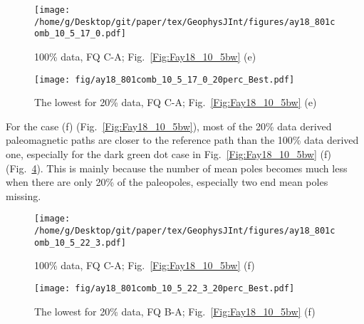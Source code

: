 \begin{figure*}[tbp]
  \captionsetup[subfigure]{labelformat=empty,aboveskip=-6pt,belowskip=-6pt}
  \centering
  \begin{subfigure}[htbp]{.49\textwidth}
    \captionsetup{skip=0pt}
    \centering
    \texttt{[image: /home/g/Desktop/git/paper/tex/GeophysJInt/figures/ay18\_801comb\_10\_5\_17\_0.pdf]}
	\caption{100\% data, FQ C-A; Fig.~\ref{Fig:Fay18_10_5bw}
	(e)}\label{Fig:Fay18_10_5b801}
  \end{subfigure}
  \begin{subfigure}[htbp]{.49\textwidth}
    \captionsetup{skip=0pt}
    \centering
    \texttt{[image: fig/ay18\_801comb\_10\_5\_17\_0\_20perc\_Best.pdf]} %
    \caption{The lowest for 20\% data, FQ C-A;
	Fig.~\ref{Fig:Fay18_10_5bw} (e)}\label{Fig:Fay18_10_5b801l20p}
  \end{subfigure}
  \caption[Less data, better similarity?]{Comparing the 100\% Australian
  120 Ma paleomagnetic data derived result with the best of the only
  20\% data derived results (the dark green dot in Fig.~\ref{Fig:Fay18_10_5bw}
  (e)).}\label{Fig:Fay18_10_5b801l20p_vs_100p}
\end{figure*}

For the case (f) (Fig.~\ref{Fig:Fay18_10_5bw}), most of the 20\% data derived
paleomagnetic paths are closer to the reference path than the 100\% data derived
one, especially for the dark green dot case in Fig.~\ref{Fig:Fay18_10_5bw} (f)
(Fig.~\ref{Fig:Fay18_10_5w801l20p}). This is mainly because the number of mean
poles becomes much less when there are only 20\% of the paleopoles, especially
two end mean poles missing.

\begin{figure*}[tbp]
  \captionsetup[subfigure]{labelformat=empty,aboveskip=-6pt,belowskip=-6pt}
  \centering
  \begin{subfigure}[htbp]{.49\textwidth}
    \captionsetup{skip=0pt}
    \centering
    \texttt{[image: /home/g/Desktop/git/paper/tex/GeophysJInt/figures/ay18\_801comb\_10\_5\_22\_3.pdf]}
	\caption{100\% data, FQ C-A; Fig.~\ref{Fig:Fay18_10_5bw}
	(f)}\label{Fig:Fay18_10_5w801}
  \end{subfigure}
  \begin{subfigure}[htbp]{.49\textwidth}
    \captionsetup{skip=0pt}
    \centering
    \texttt{[image: fig/ay18\_801comb\_10\_5\_22\_3\_20perc\_Best.pdf]} %
    \caption{The lowest for 20\% data, FQ B-A;
	Fig.~\ref{Fig:Fay18_10_5bw} (f)}\label{Fig:Fay18_10_5w801l20p}
  \end{subfigure}
  \caption[Less data, better similarity?]{Comparing the 100\% Australian
  120 Ma paleomagnetic data derived result with the best of the only
  20\% data derived results (the dark green dot in Fig.~\ref{Fig:Fay18_10_5bw}
  (f)).}\label{Fig:Fay18_10_5w801l20p_vs_100p}
\end{figure*}

